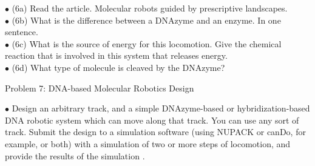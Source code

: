 \documentclass{article}
\begin{document}
$\bullet$ (6a) Read the article. Molecular robots guided by prescriptive landscapes. \\

$\bullet$ (6b) What is the difference between a DNAzyme and an enzyme. In one sentence. \\

$\bullet$ (6c) What is the source of energy for this locomotion. Give the chemical reaction that is involved in this system that releases energy. \\

$\bullet$ (6d) What type of molecule is cleaved by the DNAzyme?\\







\newpage
\centerline{\sc Problem 7:  DNA-based Molecular Robotics Design}
\vspace{0.2in}


$\bullet$ Design an arbitrary track, and a simple DNAzyme-based or hybridization-based DNA robotic system which can move along that track. You can use any sort of track. Submit the design to a simulation software (using NUPACK or canDo, for example, or both) with a simulation of two or more steps of locomotion, and provide the results of the simulation .




\end{document}

